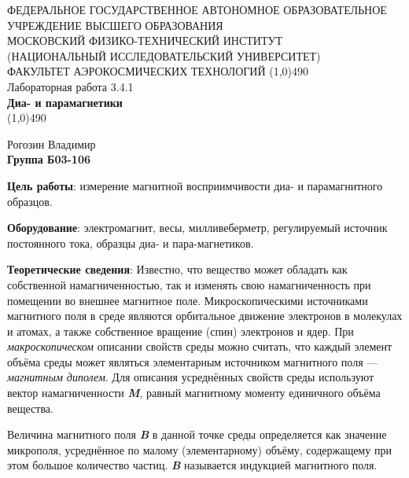 \documentclass[a4paper,12pt]{article}
\begin{document}
\begin{titlepage}
\begin{center}
\large{\small ФЕДЕРАЛЬНОЕ ГОСУДАРСТВЕННОЕ АВТОНОМНОЕ ОБРАЗОВАТЕЛЬНОЕ\\ УЧРЕЖДЕНИЕ ВЫСШЕГО ОБРАЗОВАНИЯ \\ МОСКОВСКИЙ ФИЗИКО-ТЕХНИЧЕСКИЙ ИНСТИТУТ\\ (НАЦИОНАЛЬНЫЙ ИССЛЕДОВАТЕЛЬСКИЙ УНИВЕРСИТЕТ)\\ ФАКУЛЬТЕТ АЭРОКОСМИЧЕСКИХ ТЕХНОЛОГИЙ}
\vfill
\line(1,0){490}\\[1mm]
\huge{Лабораторная работа 3.4.1}\\
\huge\textbf{Диа- и парамагнетики}\\
\line(1,0){490}\\[1mm]
\vfill
\begin{flushright}
\normalsize{Рогозин Владимир}\\
\normalsize{\textbf{Группа Б03-106}}\\
\end{flushright}
\end{center}
\end{titlepage}


\textbf{Цель работы}: 
измерение магнитной восприимчивости диа- и парамагнитного образцов.

\textbf{Оборудование}: 
электромагнит, весы, милливеберметр, регулируемый источник постоянного тока, образцы диа- и пара-магнетиков.   

\textbf{Теоретические сведения}: 
Известно, что вещество может обладать как собственной намагниченностью, так и изменять свою намагниченность при помещении во внешнее магнитное поле. Микроскопическими источниками магнитного поля в среде являются орбитальное движение электронов в молекулах и атомах, а также собственное вращение (спин) электронов и ядер. При \textit{макроскопическом} описании свойств среды можно считать, что каждый элемент объёма среды может являться элементарным источником магнитного поля — \textit{магнитным диполем}.  Для описания усреднённых свойств среды используют вектор намагниченности \textit{\textbf{M}}, равный магнитному моменту единичного объёма вещества.

 Величина магнитного поля \textit{\textbf{B}} в данной точке среды определяется как значение микрополя, усреднённое по малому (элементарному) объёму, содержащему при этом большое количество частиц. \textit{\textbf{B}} называется индукцией магнитного поля.
\end{document}
